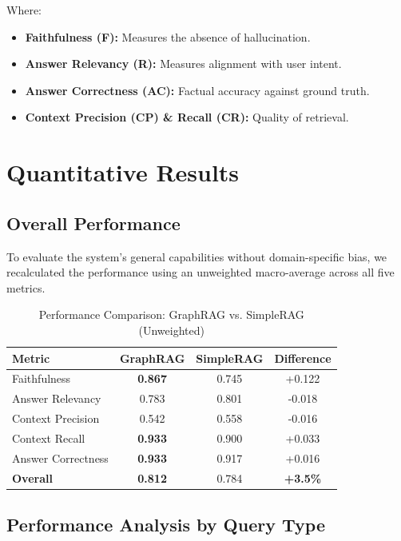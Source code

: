 \documentclass[a4paper, 12pt]{extreport}
\begin{document}
Where:
\begin{itemize}
    \item \textbf{Faithfulness (F):} Measures the absence of hallucination.
    \item \textbf{Answer Relevancy (R):} Measures alignment with user intent.
    \item \textbf{Answer Correctness (AC):} Factual accuracy against ground truth.
    \item \textbf{Context Precision (CP) \& Recall (CR):} Quality of retrieval.
\end{itemize}

\section{Quantitative Results}
\label{sec:quant_results}

\subsection{Overall Performance}
\label{sec:unweighted_results}

To evaluate the system's general capabilities without domain-specific bias, we recalculated the performance using an unweighted macro-average across all five metrics.

\begin{table}[h]
\centering
\caption{Performance Comparison: GraphRAG vs. SimpleRAG (Unweighted)}
\label{tab:unweighted_results}
\begin{tabular}{lccc}
\toprule
\textbf{Metric} & \textbf{GraphRAG} & \textbf{SimpleRAG} & \textbf{Difference} \\ \midrule
Faithfulness & \textbf{0.867} & 0.745 & +0.122 \\ 
Answer Relevancy & 0.783 & 0.801 & -0.018 \\ 
Context Precision & 0.542 & 0.558 & -0.016 \\ 
Context Recall & \textbf{0.933} & 0.900 & +0.033 \\ 
Answer Correctness & \textbf{0.933} & 0.917 & +0.016 \\ 
\textbf{Overall} & \textbf{0.812} & 0.784 & \textbf{+3.5\%} \\ \bottomrule
\end{tabular}
\end{table}

\subsection{Performance Analysis by Query Type}
\label{sec:query_performance}
\end{document}
